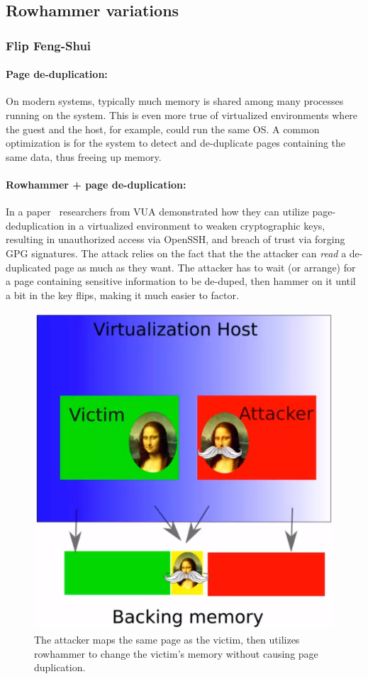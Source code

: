 \subsection{Rowhammer variations}\label{subsec:rowhammer_variations}
\subsubsection{Flip Feng-Shui}\label{subsubsec:flip_feng_shui}
\paragraph{Page de-duplication:} On modern systems, typically much memory is shared among many processes running on the system. This is even more true of virtualized environments where the guest and the host, for example, could run the same OS\@. A common optimization is for the system to detect and de-duplicate pages containing the same data, thus freeing up memory.
\paragraph{Rowhammer + page de-duplication:}
In a paper~\cite{ffs} researchers from VUA demonstrated how they can utilize page-deduplication in a virtualized environment to weaken cryptographic keys, resulting in unauthorized access via OpenSSH, and breach of trust via forging GPG signatures. The attack relies on the fact that the the attacker can \emph{read} a de-duplicated page as much as they want. The attacker has to wait (or arrange) for a page containing sensitive information to be de-duped, then hammer on it until a bit in the key flips, making it much easier to factor.
\begin{figure}[!ht]
	\centering
	\includegraphics[width=0.5\linewidth]{images/chapter_9/flip_feng_shui.PNG}
	\caption{The attacker maps the same page as the victim, then utilizes rowhammer to change the victim's memory without causing page duplication.}
	\label{fig:flip_feng_shui}
\end{figure}

